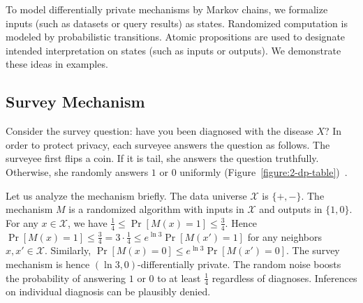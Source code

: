 To model differentially private mechanisms by Markov chains, we
formalize inputs (such as datasets or query results) as states. 
Randomized computation is modeled by probabilistic transitions. Atomic
propositions are used to designate intended interpretation on states
(such as inputs or outputs). We demonstrate these ideas in examples.


\subsection{Survey Mechanism}
\label{subsec:survey}

Consider the survey question: have you been diagnosed
with the disease $X$? In order to protect privacy, each surveyee
answers the question as follows. The surveyee first flips a
coin. If it is tail, she answers the question truthfully. Otherwise,
she randomly answers $1$ or $0$
uniformly (Figure~\ref{figure:2-dp-table})~\cite{DR:14:AFDP}.

Let us analyze the mechanism briefly. The data universe $\mathcal{X}$
is $\{ +, - \}$. The mechanism $M$ is a randomized algorithm with
inputs in $\mathcal{X}$ and outputs in $\{ 1, 0 \}$. For any $x \in
\mathcal{X}$, we have $\frac{1}{4} \leq \Pr[M (x) = 1] \leq
\frac{3}{4}$. Hence $\Pr[M (x) = 1] \leq \frac{3}{4} = 3 \cdot
\frac{1}{4} \leq e^{\ln 3} \Pr[M (x') = 1]$ for any neighbors $x, x'
\in \mathcal{X}$. Similarly, $\Pr[M (x) = 0] \leq e^{\ln 3} \Pr[M (x')
= 0]$. The survey mechanism is hence $(\ln 3, 0)$-differentially private.
The random noise boosts the probability of answering
$1$ or $0$ to at least $\frac{1}{4}$ regardless of
diagnoses. Inferences on individual diagnosis can be plausibly denied.

